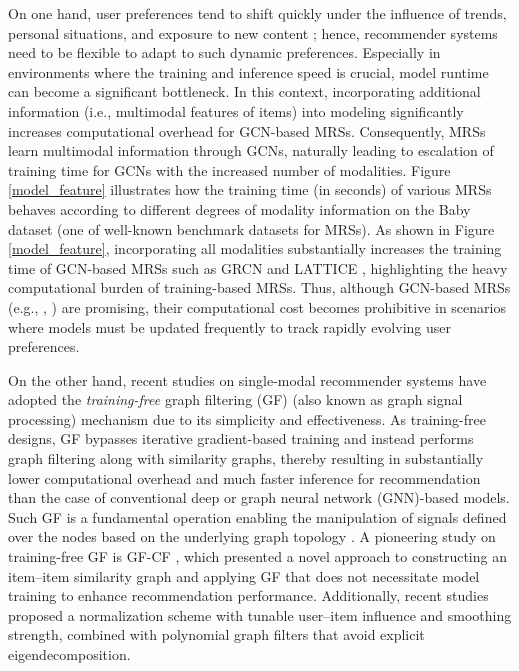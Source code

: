 \documentclass[a4paper,fleqn]{cas-sc}
\renewcommand{\cite}{\citep}
\begin{document}
On one hand, user preferences tend to shift quickly under the influence of trends, personal situations, and exposure to new content \cite{ju2015using, DBLP:journals/ml/PereiraGAO18}; hence, recommender systems need to be flexible to adapt to such dynamic preferences. Especially in environments where the training and inference speed is crucial, model runtime can become a significant bottleneck. In this context, incorporating additional information (i.e., multimodal features of items) into modeling significantly increases computational overhead for GCN-based MRSs. Consequently, MRSs learn multimodal information through GCNs, naturally leading to escalation of training time for GCNs with the increased number of modalities. Figure \ref{model_feature} illustrates how the training time (in seconds) of various MRSs behaves according to different degrees of modality information on the Baby dataset (one of well-known benchmark datasets for MRSs). As shown in Figure \ref{model_feature}, incorporating all modalities substantially increases the training time of GCN-based MRSs such as GRCN \cite{DBLP:conf/mm/WeiWN0C20} and LATTICE \cite{DBLP:conf/mm/Zhang00WWW21}, highlighting the heavy computational burden of training-based MRSs. Thus, although GCN-based MRSs (e.g., \cite{DBLP:conf/mm/WeiWN0C20}, \cite{DBLP:conf/mm/Zhang00WWW21}) are promising, their computational cost becomes prohibitive in scenarios where models must be updated frequently to track rapidly evolving user preferences.

On the other hand, recent studies on single-modal recommender systems \cite{DBLP:conf/cikm/ShenWZSZLL21, DBLP:conf/www/XiaLGLLG22, DBLP:conf/www/LiuLGL0SG23, DBLP:conf/sigir/ParkSS24} have adopted the {\it training-free} graph filtering (GF) (also known as graph signal processing) mechanism due to its simplicity and effectiveness. As training-free designs, GF bypasses iterative gradient-based training and instead performs graph filtering along with similarity graphs, thereby resulting in substantially lower computational overhead and much faster inference for recommendation than the case of conventional deep or graph neural network (GNN)-based models. Such GF is a fundamental operation enabling the manipulation of signals defined over the nodes based on the underlying graph topology \cite{DBLP:conf/nips/DefferrardBV16, DBLP:journals/tsp/IsufiGSS24}. A pioneering study on training-free GF is GF-CF \cite{DBLP:conf/cikm/ShenWZSZLL21}, which presented a novel approach to constructing an item--item similarity graph and applying GF that does not necessitate model training to enhance recommendation performance. Additionally, recent studies \cite{DBLP:conf/sigir/ParkSS24, DBLP:conf/www/ParkYS25, DBLP:conf/www/KimCPS25} proposed a normalization scheme with tunable user--item influence and smoothing strength, combined with polynomial graph filters that avoid explicit eigendecomposition.
\end{document}

